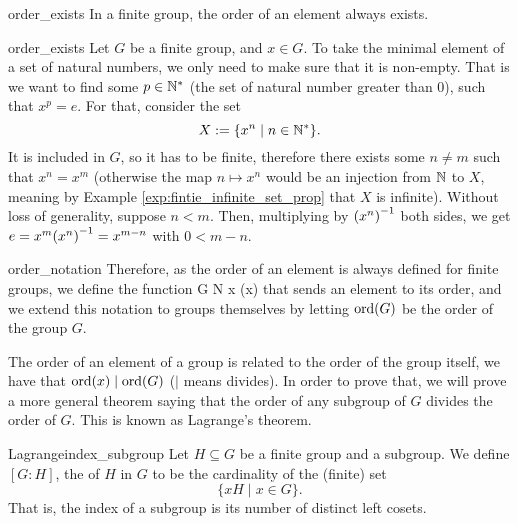 \begin{clem}{}{order_exists}
    In a finite group, the order of an element always exists.
\end{clem}
\begin{lemproof}{order_exists}
    Let \( G \) be a finite group, and \( x \in G \). To take the minimal element of a set of natural numbers, we only need to make sure that it is non-empty. That is we want to find some \( p \in \mathbb{N}^* \) (the set of natural number greater than 0), such that \( x^p = e \). For that, consider the set 
    \begin{equation*}
        X := \{ x^n \mid n \in \mathbb{N}^* \}.
    \end{equation*}
    It is included in \( G \), so it has to be finite, therefore there exists some \( n \neq m \) such that \( x^n = x^m \) (otherwise the map \( n \mapsto x^n \) would be an injection from \( \mathbb{N} \) to \( X \), meaning by Example \ref{exp:fintie_infinite_set_prop} that \( X \) is infinite). Without loss of generality, suppose \( n < m \). Then, multiplying by \( {(x^n)}^{-1} \) both sides, we get \( e = x^m {(x^n)}^{-1} = x^{m-n} \) with \( 0 < m - n \). 
\end{lemproof}

\begin{crem}{}{order_notation}
    Therefore, as the order of an element is always defined for finite groups, we define the function
    \fun \ord G {\bb N} x {\ord(x)}
    that sends an element to its order, and we extend this notation to groups themselves by letting \( \operatorname{ord}(G) \) be the order of the group \( G \).  
\end{crem}

The order of an element of a group is related to the order of the group itself, we have that \( \operatorname{ord}(x) \mid \operatorname{ord}(G) \) (\( \mid \) means divides). In order to prove that, we will prove a more general theorem saying that the order of any subgroup of \( G \) divides the order of \( G \). This is known as Lagrange's theorem.

\begin{cdef}{Lagrange}{index_subgroup}
    Let \( H \subseteq G \) be a finite group and a subgroup. We define \( [G : H] \), the  of \( H \) in \( G \) to be the cardinality of the (finite) set 
    \begin{equation*}
        \{ x H \mid x \in G \}.
    \end{equation*}
    That is, the index of a subgroup is its number of distinct left cosets.  
\end{cdef}

